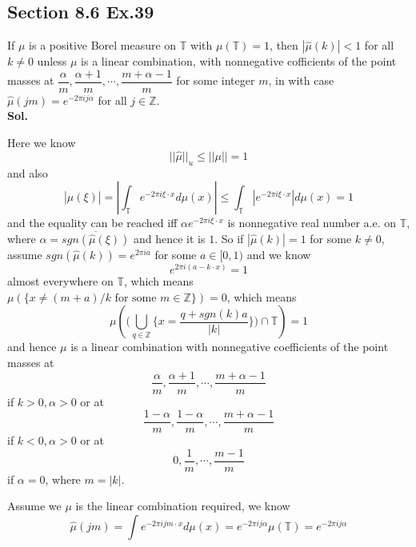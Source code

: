 \documentclass[lang=en,11pt,a4paper,citestyle =authoryear]{elegantpaper}
\newcommand{\Z}{\mathbb{Z}}
\begin{document}
\subsection*{Section 8.6 Ex.39}
If $\mu$ is a positive Borel measure on $\mathbb{T}$ with $\mu(\mathbb{T})=1$, then $|\widehat{\mu}(k)| < 1$ for all $k\neq 0$ unless $\mu$ is a linear combination, with nonnegative cofficients of the point masses at $\dfrac{\alpha}{m},\dfrac{\alpha+1}{m},\cdots,\dfrac{m+\alpha-1}{m}$ for some integer $m$, in with case $\widehat{\mu}(jm) = e^{-2\pi ij\alpha}$ for all $j\in\Z$.
\vspace{0.5em}\\
\textbf{Sol.} \par
    Here we know
    \[
    ||\widehat{\mu}||_u \leq ||\mu|| = 1
    \]
    and also
    \[
    |\widehat{\mu}(\xi)| = |\int_{\mathbb{T}} e^{-2\pi i \xi \cdot x} d\mu(x)| \leq \int_{\mathbb{T}}|e^{-2\pi i \xi \cdot x}|d\mu(x) = 1 
    \]
    and the equality can be reached iff $\alpha e^{-2\pi i \xi\cdot x}$ is nonnegative real number a.e. on $\mathbb{T}$, where $\alpha = \overline{sgn(\hat{\mu}(\xi))}$ and hence it is $1$. So if $|\widehat{\mu}(k)| = 1$ for some $k\neq 0$, assume $sgn(\hat{\mu}(k)) = e^{2\pi i a}$ for some $a\in[0,1)$ and we know
    \[
    e^{2\pi i(a - k \cdot x)} = 1
    \]
    almost everywhere on $\mathbb{T}$, which means $\mu(\{x \neq (m+a)/k\text{ for some }m\in\Z\}) = 0$, which means
    \[\mu(\Big(\bigcup_{q\in\Z}\{x = \dfrac{q+sgn(k)a}{|k|}\}\Big)\cap\mathbb{T}) = 1\]
    and hence $\mu$ is a linear combination with nonnegative coefficients of the point masses at \[\dfrac{\alpha}{m},\dfrac{\alpha+1}{m},\cdots,\dfrac{m+\alpha-1}{m}\] if $k>0,\alpha > 0$ or at \[\dfrac{1-\alpha}{m},\dfrac{1-\alpha}{m},\cdots,\dfrac{m+\alpha-1}{m}\] if $k<0,\alpha > 0$ or at \[0,\dfrac{1}{m},\cdots,\dfrac{m-1}{m}\] if $\alpha = 0$, where $m = |k|$.\par
    Assume we $\mu$ is the linear combination required, we know
    \[
    \widehat{\mu}(jm) = \int e^{-2\pi i jm\cdot x}d\mu(x) = e^{-2\pi i j \alpha}\mu(\mathbb{T}) = e^{-2\pi i j \alpha}
    \]
\addappheadtotoc
\end{document}
